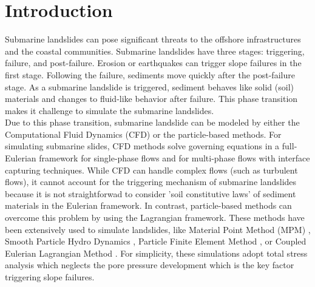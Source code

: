 \documentclass[preprint,12pt]{elsarticle}
\begin{document}
\newpage
%
\section{\textsf{Introduction}}
Submarine landslides can pose significant threats to the offshore infrastructures and the coastal communities. Submarine landslides have three stages: triggering, failure, and post-failure. Erosion or earthquakes can trigger slope failures in the first stage. Following the failure, sediments move quickly after the post-failure stage. As a submarine landslide is triggered, sediment behaves like solid (soil) materials and changes to fluid-like behavior after failure. This phase transition makes it challenge to simulate the submarine landslides.\\

Due to this phase transition, submarine landslide can be modeled by either the Computational Fluid Dynamics (CFD) or the particle-based methods. For simulating submarine slides, CFD methods solve governing equations in a full-Eulerian framework for single-phase flows \cite{CFD1, CFD2} and for multi-phase flows \cite{CFD3, CFD4} with interface capturing techniques. While CFD can handle complex flows (such as turbulent flows), it cannot account for the triggering mechanism of submarine landslides because it is not straightforwad to consider 'soil constitutive laws' of sediment materials in the Eulerian framework. In contrast, particle-based methods can overcome this problem by using the Lagrangian framework. These methods have been extensively used to simulate landslides, like Material Point Method (MPM) \cite{Tran2019}, Smooth Particle Hydro Dynamics \cite{Capone2010}, Particle Finite Element Method \cite{Zhang2019}, or Coupled Eulerian Lagrangian Method \cite{Dey2016}. For simplicity, these simulations adopt total stress analysis which neglects the pore pressure development which is the key factor triggering slope failures. \\
\end{document}
